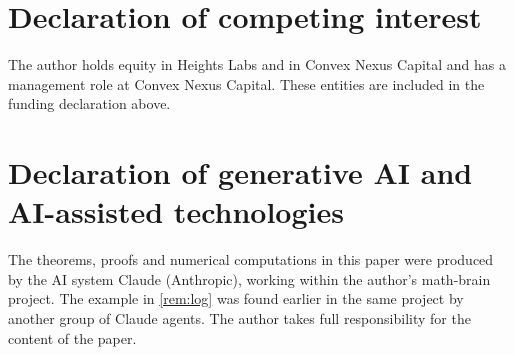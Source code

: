 \documentclass[11pt]{amsart}
\theoremstyle{remark}
\begin{document}
\section*{Declaration of competing interest}
The author holds equity in Heights Labs and in Convex Nexus Capital and has a management role at Convex Nexus
Capital. These entities are included in the funding declaration above.

\section*{Declaration of generative AI and AI-assisted technologies}
The theorems, proofs and numerical computations in this paper were produced by the AI system Claude (Anthropic),
working within the author's math-brain project. The example in \cref{rem:log} was found earlier in the same project
by another group of Claude agents. The author takes full responsibility for the content of the paper.
\end{document}
